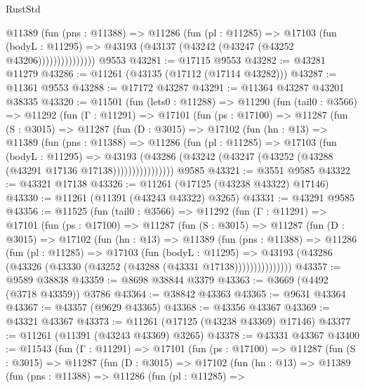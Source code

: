 \begin{lexlean}{RustStd}
\begin{coremodule}
                  @11389
                    (fun (pns : @11388) =>
                    @11286
                      (fun (pl : @11285) =>
                      @17103
                        (fun (bodyL : @11295) =>
                        @43193 (@43137 (@43242 (@43247 (@43252 @43206)))))))))))))))
    @9553
@43281 := @17115 @9553
@43282 := @43281 @11279
@43286 := @11261 (@43135 (@17112 (@17114 @43282)))
@43287 := @11361 @9553
@43288 := @17172 @43287
@43291 := @11364 @43287 @43201 @38335
@43320 := @11501
    (fun (lets0 : @11288) =>
    @11290
      (fun (tail0 : @3566) =>
      @11292
        (fun (Γ : @11291) =>
        @17101
          (fun (ps : @17100) =>
          @11287
            (fun (S : @3015) =>
            @11287
              (fun (D : @3015) =>
              @17102
                (fun (hn : @13) =>
                @11389
                  (fun (pns : @11388) =>
                  @11286
                    (fun (pl : @11285) =>
                    @17103
                      (fun (bodyL : @11295) =>
                      @43193
                        (@43286
                          (@43242 (@43247 (@43252 (@43288 (@43291 @17136 @17138))))))))))))))))
    @9585
@43321 := @3551 @9585
@43322 := @43321 @17138
@43326 := @11261 (@17125 (@43238 @43322) @17146)
@43330 := @11261 (@11391 (@43243 @43322) @3265)
@43331 := @43291 @9585
@43356 := @11525
    (fun (tail0 : @3566) =>
    @11292
      (fun (Γ : @11291) =>
      @17101
        (fun (ps : @17100) =>
        @11287
          (fun (S : @3015) =>
          @11287
            (fun (D : @3015) =>
            @17102
              (fun (hn : @13) =>
              @11389
                (fun (pns : @11388) =>
                @11286
                  (fun (pl : @11285) =>
                  @17103
                    (fun (bodyL : @11295) =>
                    @43193 (@43286 (@43326 (@43330 (@43252 (@43288 (@43331 @17138)))))))))))))))
@43357 := @9589 @38838
@43359 := @8698 @38844 @3379
@43363 := @3669 (@4492 (@3718 @43359)) @3786
@43364 := @38842 @43363
@43365 := @9631 @43364
@43367 := @43357 (@9629 @43365)
@43368 := @43356 @43367
@43369 := @43321 @43367
@43373 := @11261 (@17125 (@43238 @43369) @17146)
@43377 := @11261 (@11391 (@43243 @43369) @3265)
@43378 := @43331 @43367
@43400 := @11543
    (fun (Γ : @11291) =>
    @17101
      (fun (ps : @17100) =>
      @11287
        (fun (S : @3015) =>
        @11287
          (fun (D : @3015) =>
          @17102
            (fun (hn : @13) =>
            @11389
              (fun (pns : @11388) =>
              @11286
                (fun (pl : @11285) =>

\end{coremodule}
\end{lexlean}
